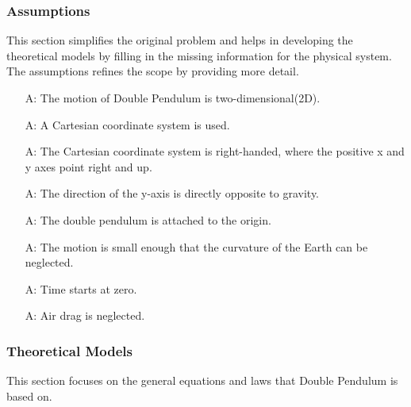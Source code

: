 \documentclass[12pt]{article}
\newcounter{assumpnum} %
\begin{document}
\subsubsection{Assumptions}\label{sec_assumpt}
This section simplifies the original problem and helps in developing the theoretical models by filling in the missing information for the physical system. The assumptions refines the scope by providing more detail.
\begin{itemize}

\item[A\refstepcounter{assumpnum}\theassumpnum \label{A_2D}:]
The motion of Double Pendulum is two-dimensional(2D).  
\item[A\refstepcounter{assumpnum}\theassumpnum \label{A_cartSys}:]
A Cartesian coordinate system is used. 
\item[A\refstepcounter{assumpnum}\theassumpnum \label{A_righthanded}:]
The Cartesian coordinate system is right-handed, where the positive x and y axes point right and up. 
\item[A\refstepcounter{assumpnum}\theassumpnum \label{A_yGravity}:]
The direction of the y-axis is directly opposite to gravity.  
\item[A\refstepcounter{assumpnum}\theassumpnum \label{A_origin}:]
The double pendulum is attached to the origin.  
\item[A\refstepcounter{assumpnum}\theassumpnum \label{A_neglectCurve}:]
The motion is small enough that the curvature of the Earth can be neglected.  
\item[A\refstepcounter{assumpnum}\theassumpnum \label{A_timeZero}:]
Time starts at zero.  
\item[A\refstepcounter{assumpnum}\theassumpnum \label{A_neglectDrag}:]
Air drag is neglected.  

\end{itemize}


\subsubsection{Theoretical Models}\label{sec_tm}
This section focuses on the general equations and laws that Double Pendulum is based on. 
\end{document}
